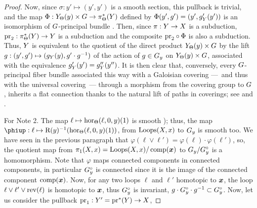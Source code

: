 \begin{proof}
  Now,
  since $\sigma : y' \mapsto (y',y')$ is a smooth section,
  this pullback is trivial,
  and the map $\Phi : Y_\Theta(y) \times G \to \pi_\Theta^*(Y)$ defined by $\Phi(y',g') = (y',g'_Y(y'))$ is an isomorphism of $G$-principal bundle .
  Then,
  since $\pi : Y \to X$ is a subduction,
  $\mathrm{pr}_2 : \pi_\Theta^*(Y) \to Y$ is a subduction and the composite $\mathrm{pr}_2 \circ \Phi$ is also a subduction.
  Thus, $Y$ is equivalent to the quotient of the direct product $Y_\Theta(y) \times G$ by the lift $g : (y',g') \mapsto (g_Y(y), g' \cdot g^{-1})$ of the action of $g \in G_y$ on $Y_\Theta(y) \times G$,
  associated with the equivalence $g'_Y(y') = g''_Y(y'')$.
  It is then clear that,
  conversely,
  every $G$-principal fiber bundle associated this way with a Galoisian covering
  ---~and thus with the universal covering~---
  through a morphism from the covering group to $G$,
  inherits a flat connection thanks to the natural lift of paths in coverings;
  see  and .
  \begin{center}
  \end{center}
  For Note 2. The map $\ell \mapsto \operatorname{hor}_\Theta(\ell,0,y)(1)$ is smooth );
  thus,
  the map $\varphi : \ell \mapsto \orb{y}^{-1}(\hor_\Theta(\ell,0,y)(1))$,
  from $\operatorname{Loops}(X,x)$ to $G_y$ is smooth too.
  We have seen in the previous paragraph that $\varphi(\ell \vee \ell') = \varphi(\ell) \cdot \varphi(\ell')$,
  so,
  the quotient map from $\pi_1(X,x) = \operatorname{Loops}(X,x)/\operatorname{comp}({\boldsymbol x})$ to $G_y/G_y^\circ$ is a homomorphism.
  Note that $\varphi$ maps connected components in connected components,
  in particular $G_y^\circ$ is connected since it is the image of the connected component $\operatorname{comp}({\boldsymbol x})$.
  Now,
  for any two loops $\ell$ and $\ell'$ homotopic to ${\boldsymbol x}$,
  the loop $\ell \vee \ell' \vee \operatorname{rev}(\ell)$ is homotopic to ${\boldsymbol x}$,
  thus $G_y^\circ$ is invariant,
  $g \cdot G_y^\circ \cdot g^{-1} \subset G_y^\circ$.
  Now, let us consider the pullback $\mathrm{pr}_1 : Y' = \mathrm{pr}^*(Y) \to X$,

\end{proof}
